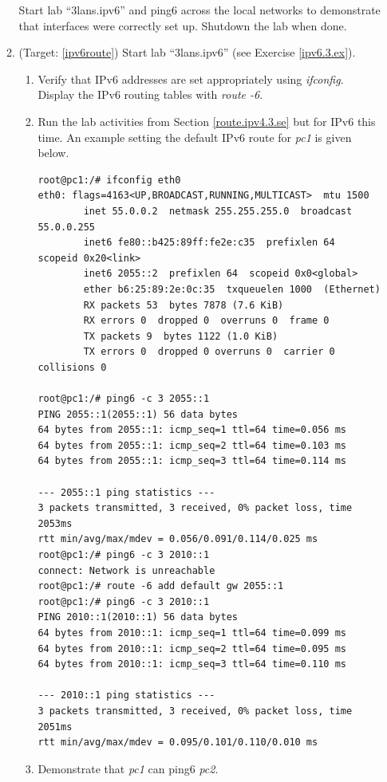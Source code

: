 \documentclass[12pt]{book}
\begin{document}
\begin{enumerate}[label=\arabic*.]
\begin{enumerate}[label=\arabic*.]
  Start lab ``3lans.ipv6'' and ping6 across the local networks to demonstrate that interfaces were correctly set up. Shutdown the lab when done.

\item (Target: \ref{ipv6route}) Start lab ``3lans.ipv6'' (see Exercise \ref{ipv6.3.ex}).
  \begin{enumerate}[label=(\alph*)]
  \item Verify that IPv6 addresses are set appropriately using \emph{ifconfig}. Display the IPv6 routing tables with \emph{route -6}.
  \item Run the lab activities from Section \ref{route.ipv4.3.se} but for IPv6 this time. An example setting the default IPv6 route for \emph{pc1} is given below.
    \begin{lstlisting}
root@pc1:/# ifconfig eth0
eth0: flags=4163<UP,BROADCAST,RUNNING,MULTICAST>  mtu 1500
        inet 55.0.0.2  netmask 255.255.255.0  broadcast 55.0.0.255
        inet6 fe80::b425:89ff:fe2e:c35  prefixlen 64  scopeid 0x20<link>
        inet6 2055::2  prefixlen 64  scopeid 0x0<global>
        ether b6:25:89:2e:0c:35  txqueuelen 1000  (Ethernet)
        RX packets 53  bytes 7878 (7.6 KiB)
        RX errors 0  dropped 0  overruns 0  frame 0
        TX packets 9  bytes 1122 (1.0 KiB)
        TX errors 0  dropped 0 overruns 0  carrier 0  collisions 0

root@pc1:/# ping6 -c 3 2055::1
PING 2055::1(2055::1) 56 data bytes
64 bytes from 2055::1: icmp_seq=1 ttl=64 time=0.056 ms
64 bytes from 2055::1: icmp_seq=2 ttl=64 time=0.103 ms
64 bytes from 2055::1: icmp_seq=3 ttl=64 time=0.114 ms

--- 2055::1 ping statistics ---
3 packets transmitted, 3 received, 0% packet loss, time 2053ms
rtt min/avg/max/mdev = 0.056/0.091/0.114/0.025 ms
root@pc1:/# ping6 -c 3 2010::1
connect: Network is unreachable
root@pc1:/# route -6 add default gw 2055::1
root@pc1:/# ping6 -c 3 2010::1
PING 2010::1(2010::1) 56 data bytes
64 bytes from 2010::1: icmp_seq=1 ttl=64 time=0.099 ms
64 bytes from 2010::1: icmp_seq=2 ttl=64 time=0.095 ms
64 bytes from 2010::1: icmp_seq=3 ttl=64 time=0.110 ms

--- 2010::1 ping statistics ---
3 packets transmitted, 3 received, 0% packet loss, time 2051ms
rtt min/avg/max/mdev = 0.095/0.101/0.110/0.010 ms
    \end{lstlisting}
    
  \item Demonstrate that \emph{pc1} can ping6 \emph{pc2}.
  \end{enumerate}
\end{enumerate}

\end{enumerate}



 
\end{document}

